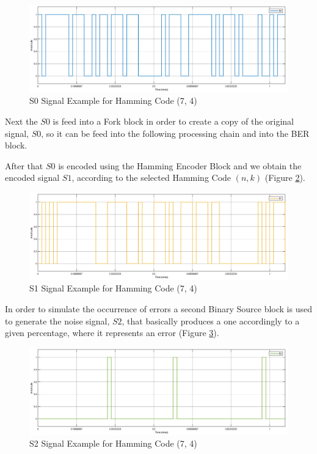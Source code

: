 \begin{refsection}
\begin{figure}[h!]
	\centering
	\includegraphics[width=.9\linewidth]{./sdf/eit_25828_hamming_channel_encoder_decoder/images/S0.png}
	\caption{S0 Signal Example for Hamming Code (7, 4)}
	\label{fig:hammingEncoderDecoder_S0}
\end{figure}

Next the $S0$ is feed into a Fork block in order to create a copy of the original signal, $S0$, so it can be feed into the following processing chain and into the BER block.

After that $S0$ is encoded using the Hamming Encoder Block and we obtain the encoded signal $S1$, according to the selected Hamming Code $(n, k)$ (Figure \ref{fig:hammingEncoderDecoder_S1}).

\begin{figure}[h!]
	\centering
	\includegraphics[width=.9\linewidth]{./sdf/eit_25828_hamming_channel_encoder_decoder/images/S1.png}
	\caption{S1 Signal Example for Hamming Code (7, 4)}
	\label{fig:hammingEncoderDecoder_S1}
\end{figure}

In order to simulate the occurrence of errors a second Binary Source block is used to generate the noise signal, $S2$, that basically produces a one accordingly to a given percentage, where it represents an error (Figure \ref{fig:hammingEncoderDecoder_S2}).

\begin{figure}[h!]
	\centering
	\includegraphics[width=.9\linewidth]{./sdf/eit_25828_hamming_channel_encoder_decoder/images/S2.png}
	\caption{S2 Signal Example for Hamming Code (7, 4)}
	\label{fig:hammingEncoderDecoder_S2}
\end{figure}


\end{refsection}

